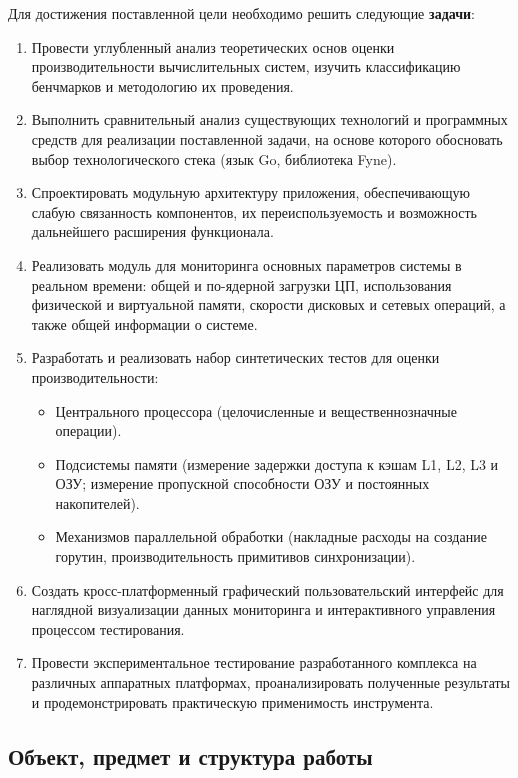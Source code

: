 Для достижения поставленной цели необходимо решить следующие \textbf{задачи}:
\begin{enumerate}
    \item Провести углубленный анализ теоретических основ оценки производительности вычислительных систем, изучить классификацию бенчмарков и методологию их проведения.
    \item Выполнить сравнительный анализ существующих технологий и программных средств для реализации поставленной задачи, на основе которого обосновать выбор технологического стека (язык Go, библиотека Fyne).
    \item Спроектировать модульную архитектуру приложения, обеспечивающую слабую связанность компонентов, их переиспользуемость и возможность дальнейшего расширения функционала.
    \item Реализовать модуль для мониторинга основных параметров системы в реальном времени: общей и по-ядерной загрузки ЦП, использования физической и виртуальной памяти, скорости дисковых и сетевых операций, а также общей информации о системе.
    \item Разработать и реализовать набор синтетических тестов для оценки производительности:
    \begin{itemize}
        \item Центрального процессора (целочисленные и вещественнозначные операции).
        \item Подсистемы памяти (измерение задержки доступа к кэшам L1, L2, L3 и ОЗУ; измерение пропускной способности ОЗУ и постоянных накопителей).
        \item Механизмов параллельной обработки (накладные расходы на создание горутин, производительность примитивов синхронизации).
    \end{itemize}
    \item Создать кросс-платформенный графический пользовательский интерфейс для наглядной визуализации данных мониторинга и интерактивного управления процессом тестирования.
    \item Провести экспериментальное тестирование разработанного комплекса на различных аппаратных платформах, проанализировать полученные результаты и продемонстрировать практическую применимость инструмента.
\end{enumerate}

\subsection*{Объект, предмет и структура работы}

